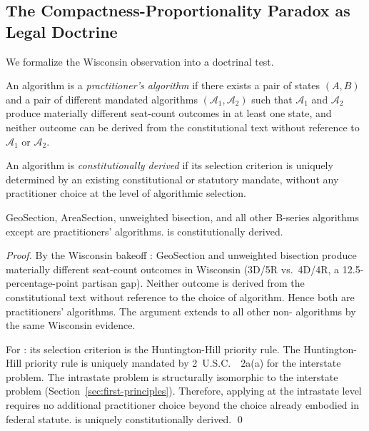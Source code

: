 \subsection{The Compactness-Proportionality Paradox as Legal Doctrine}

We formalize the Wisconsin observation into a doctrinal test.

\begin{definition}
An algorithm is a \emph{practitioner's algorithm} if there exists a
pair of states $(A, B)$ and a pair of different mandated algorithms
$(\mathcal{A}_1, \mathcal{A}_2)$ such that $\mathcal{A}_1$ and $\mathcal{A}_2$
produce materially different seat-count outcomes in at least one state,
and neither outcome can be derived from the constitutional text without
reference to $\mathcal{A}_1$ or $\mathcal{A}_2$.
\end{definition}

\begin{definition}
An algorithm is \emph{constitutionally derived} if its selection criterion
is uniquely determined by an existing constitutional or statutory mandate,
without any practitioner choice at the level of algorithmic selection.
\end{definition}

\begin{proposition}
GeoSection, AreaSection, unweighted bisection, and all other B-series
algorithms except \ar{} are practitioners' algorithms.
\ar{} is constitutionally derived.
\end{proposition}

\begin{proof}
By the Wisconsin bakeoff \citep{b0paper}: GeoSection and unweighted bisection
produce materially different seat-count outcomes in Wisconsin
(3D/5R vs.\ 4D/4R, a 12.5-percentage-point partisan gap).
Neither outcome is derived from the constitutional text without reference
to the choice of algorithm.
Hence both are practitioners' algorithms.
The argument extends to all other non-\ar{} algorithms by the same
Wisconsin evidence.

For \ar{}: its selection criterion is the Huntington-Hill priority rule.
The Huntington-Hill priority rule is uniquely mandated by 2~U.S.C.~\usca{}~2a(a)
for the interstate problem.
The intrastate problem is structurally isomorphic to the interstate problem
(Section~\ref{sec:first-principles}).
Therefore, applying \hh{} at the intrastate level requires no additional
practitioner choice beyond the choice already embodied in federal statute.
\ar{} is uniquely constitutionally derived.
\qed
\end{proof}

